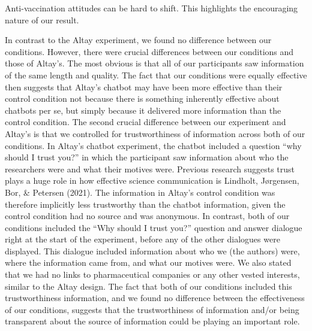 \documentclass[
  english,
  ,jou,floatsintext]{apa6}
\begin{document}
Anti-vaccination attitudes can be hard to shift. This highlights the encouraging nature of our result.

In contrast to the Altay experiment, we found no difference between our conditions. However, there were crucial differences between our conditions and those of Altay's. The most obvious is that all of our participants saw information of the same length and quality. The fact that our conditions were equally effective then suggests that Altay's chatbot may have been more effective than their control condition not because there is something inherently effective about chatbots per se, but simply because it delivered more information than the control condition. The second crucial difference between our experiment and Altay's is that we controlled for trustworthiness of information across both of our conditions. In Altay's chatbot experiment, the chatbot included a question ``why should I trust you?'' in which the participant saw information about who the researchers were and what their motives were. Previous research suggests trust plays a huge role in how effective science communication is Lindholt, Jørgensen, Bor, \& Petersen (2021). The information in Altay's control condition was therefore implicitly less trustworthy than the chatbot information, given the control condition had no source and was anonymous. In contrast, both of our conditions included the ``Why should I trust you?'' question and answer dialogue right at the start of the experiment, before any of the other dialogues were displayed. This dialogue included information about who we (the authors) were, where the information came from, and what our motives were. We also stated that we had no links to pharmaceutical companies or any other vested interests, similar to the Altay design. The fact that both of our conditions included this trustworthiness information, and we found no difference between the effectiveness of our conditions, suggests that the trustworthiness of information and/or being transparent about the source of information could be playing an important role.
\end{document}
